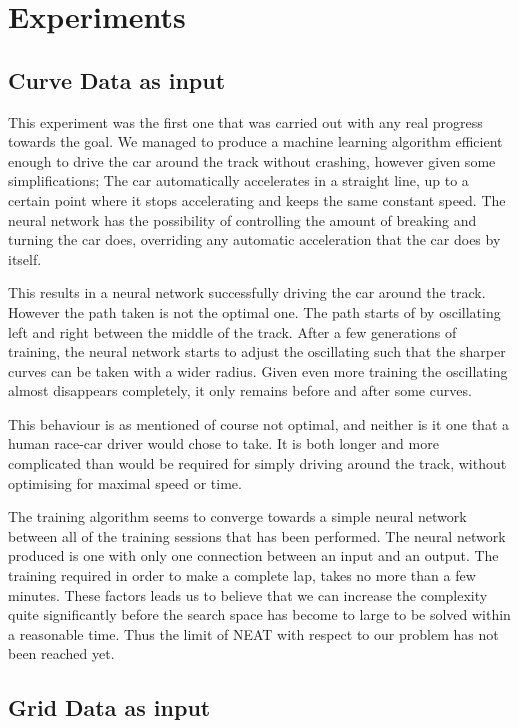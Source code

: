 \section{Experiments}

\subsection{Curve Data as input}
This experiment was the first one that was carried out with any real progress towards the goal. We managed to produce a machine learning algorithm efficient enough to drive the car around the track without crashing, however given some simplifications; The car automatically accelerates in a straight line, up to a certain point where it stops accelerating and keeps the same constant speed. The neural network has the possibility of controlling the amount of breaking and turning the car does, overriding any automatic acceleration that the car does by itself.

This results in a neural network successfully driving the car around the track. However the path taken is not the optimal one. The path starts of by oscillating left and right between the middle of the track. After a few generations of training, the neural network starts to adjust the oscillating such that the sharper curves can be taken with a wider radius. Given even more training the oscillating almost disappears completely, it only remains before and after some curves.

This behaviour is as mentioned of course not optimal, and neither is it one that a human race-car driver would chose to take. It is both longer and more complicated than would be required for simply driving around the track, without optimising for maximal speed or time.

The training algorithm seems to converge towards a simple neural network between all of the training sessions that has been performed. The neural network produced is one with only one connection between an input and an output. The training required in order to make a complete lap, takes no more than a few minutes. These factors leads us to believe that we can increase the complexity quite significantly before the search space has become to large to be solved within a reasonable time. Thus the limit of NEAT with respect to our problem has not been reached yet.


\subsection{Grid Data as input}

\fi